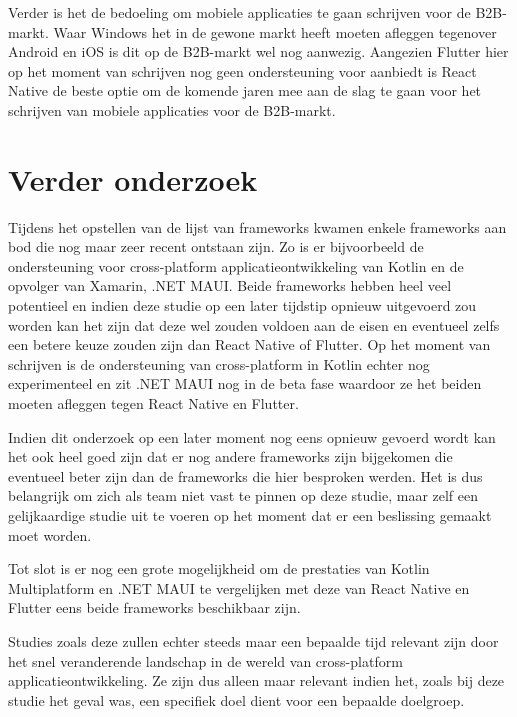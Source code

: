 Verder is het de bedoeling om mobiele applicaties te gaan schrijven voor de B2B-markt. Waar Windows het in de gewone markt heeft moeten afleggen tegenover Android en iOS is dit op de B2B-markt wel nog aanwezig. Aangezien Flutter hier op het moment van schrijven nog geen ondersteuning voor aanbiedt is React Native de beste optie om de komende jaren mee aan de slag te gaan voor het schrijven van mobiele applicaties voor de B2B-markt.

\section{Verder onderzoek}
\label{sec:verderOnderzoek}

Tijdens het opstellen van de lijst van frameworks kwamen enkele frameworks aan bod die nog maar zeer recent ontstaan zijn. Zo is er bijvoorbeeld de ondersteuning voor cross-platform applicatieontwikkeling van Kotlin en de opvolger van Xamarin, .NET MAUI. Beide frameworks hebben heel veel potentieel en indien deze studie op een later tijdstip opnieuw uitgevoerd zou worden kan het zijn dat deze wel zouden voldoen aan de eisen en eventueel zelfs een betere keuze zouden zijn dan React Native of Flutter. Op het moment van schrijven is de ondersteuning van cross-platform in Kotlin echter nog experimenteel en zit .NET MAUI nog in de beta fase waardoor ze het beiden moeten afleggen tegen React Native en Flutter.

Indien dit onderzoek op een later moment nog eens opnieuw gevoerd wordt kan het ook heel goed zijn dat er nog andere frameworks zijn bijgekomen die eventueel beter zijn dan de frameworks die hier besproken werden. Het is dus belangrijk om zich als team niet vast te pinnen op deze studie, maar zelf een gelijkaardige studie uit te voeren op het moment dat er een beslissing gemaakt moet worden.

Tot slot is er nog een grote mogelijkheid om de prestaties van Kotlin Multiplatform en .NET MAUI te vergelijken met deze van React Native en Flutter eens beide frameworks beschikbaar zijn. 

Studies zoals deze zullen echter steeds maar een bepaalde tijd relevant zijn door het snel veranderende landschap in de wereld van cross-platform applicatieontwikkeling. Ze zijn dus alleen maar relevant indien het, zoals bij deze studie het geval was, een specifiek doel dient voor een bepaalde doelgroep.






